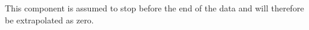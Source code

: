 This component is assumed to stop before the end of the data and will therefore be extrapolated as zero.